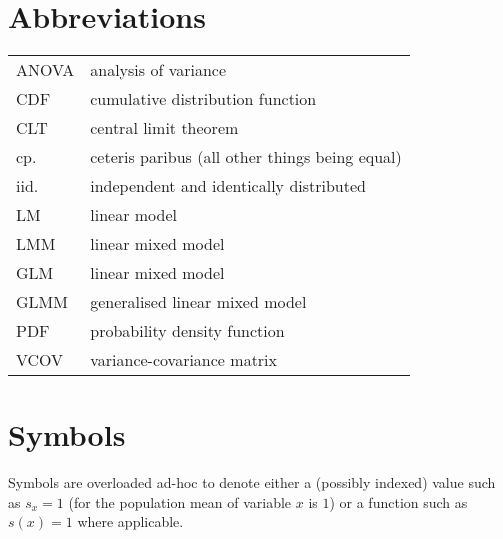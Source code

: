 
\section*{Abbreviations}

\begin{longtable}{p{}p{}}
  ANOVA & analysis of variance \\
  CDF   & cumulative distribution function \\
  CLT   & central limit theorem \\
  cp.   & ceteris paribus (all other things being equal) \\
  iid.  & independent and identically distributed \\
  LM    & linear model \\
  LMM   & linear mixed model \\
  GLM   & linear mixed model \\
  GLMM  & generalised linear mixed model \\
  PDF   & probability density function \\
  VCOV  & variance-covariance matrix \\
\end{longtable}


\section*{Symbols}

Symbols are overloaded ad-hoc to denote either a (possibly indexed) value such as $s_x=1$ (for the population mean of variable $x$ is $1$) or a function such as $s(x)=1$ where applicable.

